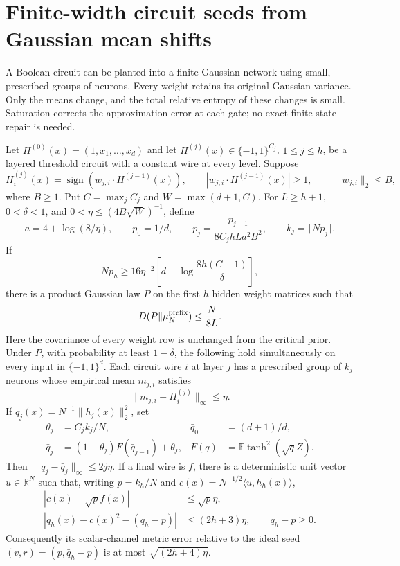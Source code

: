 \section{Finite-width circuit seeds from Gaussian mean shifts}
\label{sec:critical-finite-width-circuit-prefix}

A Boolean circuit can be planted into a finite Gaussian network using
small, prescribed groups of neurons.  Every weight retains its original
Gaussian variance.  Only the means change, and the total relative
entropy of these changes is small.  Saturation corrects the approximation
error at each gate; no exact finite-state repair is needed.

\begin{lemma}
\label{lem:critical-finite-circuit-prefix}
Let $H^{(0)}(x)=(1,x_1,\ldots,x_d)$ and let
$H^{(j)}(x)\in\{-1,1\}^{C_j}$, $1\le j\le h$, be a layered
threshold circuit with a constant wire at every level.  Suppose
\[
 H_i^{(j)}(x)=\operatorname{sign}(w_{j,i}\cdot H^{(j-1)}(x)),
 \qquad |w_{j,i}\cdot H^{(j-1)}(x)|\ge1,
 \qquad \|w_{j,i}\|_2\le B,
\]
where $B\ge1$.  Put $C=\max_j C_j$ and $W=\max(d+1,C)$.
For $L\ge h+1$, $0<\delta<1$, and
$0<\eta\le(4B\sqrt W)^{-1}$, define
\[
 a=4+\log(8/\eta),\qquad p_0=1/d,\qquad
 p_j=\frac{p_{j-1}}{8C_jhLa^2B^2},\qquad k_j=\lceil Np_j\rceil.
\]
If
\begin{equation}\label{eq:critical-finite-prefix-width}
 Np_h\ge16\eta^{-2}
       \left[d+\log\frac{8h(C+1)}\delta\right],
\end{equation}
there is a product Gaussian law $P$ on the first $h$ hidden weight
matrices such that
\[
 D(P\Vert\mu_N^{\rm prefix})\le\frac{N}{8L}.
\]
Here the covariance of every weight row is unchanged from the critical
prior.  Under $P$, with probability at least $1-\delta$, the following
hold simultaneously on every input in $\{-1,1\}^d$.
Each circuit wire $i$ at layer $j$ has a prescribed group of $k_j$
neurons whose empirical mean $m_{j,i}$ satisfies
\[
 \|m_{j,i}-H_i^{(j)}\|_\infty\le\eta.
\]
If $q_j(x)=N^{-1}\|h_j(x)\|_2^2$, set
\begin{align*}
 \theta_j&=C_jk_j/N, & \bar q_0&=(d+1)/d,\\
 \bar q_j&=(1-\theta_j)F(\bar q_{j-1})+\theta_j,
 & F(q)&=\mathbb E\tanh^2(\sqrt qZ).
\end{align*}
Then $\|q_j-\bar q_j\|_\infty\le2j\eta$.
If a final wire is $f$, there is a deterministic unit vector
$u\in\mathbb R^N$ such that, writing $p=k_h/N$ and
$c(x)=N^{-1/2}\langle u,h_h(x)\rangle$,
\begin{align}
 |c(x)-\sqrt p f(x)|&\le\sqrt p\eta,
 \label{eq:critical-finite-prefix-score}\\
 |q_h(x)-c(x)^2-(\bar q_h-p)|&\le(2h+3)\eta,
 \qquad \bar q_h-p\ge0.
 \label{eq:critical-finite-prefix-residual}
\end{align}
Consequently its scalar-channel metric error relative to the ideal seed
$(v,r)=(p,\bar q_h-p)$ is at most $\sqrt{(2h+4)\eta}$.
\end{lemma}

